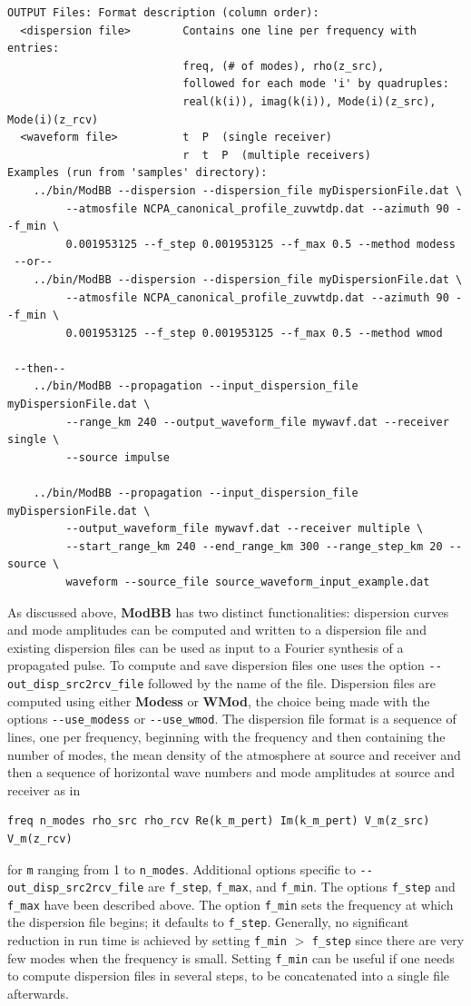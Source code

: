 \begin{verbatim}
OUTPUT Files: Format description (column order):
  <dispersion file>        Contains one line per frequency with entries:
                           freq, (# of modes), rho(z_src),
                           followed for each mode 'i' by quadruples:
                           real(k(i)), imag(k(i)), Mode(i)(z_src), Mode(i)(z_rcv)
  <waveform file>          t  P  (single receiver)
                           r  t  P  (multiple receivers)
Examples (run from 'samples' directory):
    ../bin/ModBB --dispersion --dispersion_file myDispersionFile.dat \
         --atmosfile NCPA_canonical_profile_zuvwtdp.dat --azimuth 90 --f_min \
         0.001953125 --f_step 0.001953125 --f_max 0.5 --method modess
 --or--
    ../bin/ModBB --dispersion --dispersion_file myDispersionFile.dat \
         --atmosfile NCPA_canonical_profile_zuvwtdp.dat --azimuth 90 --f_min \
         0.001953125 --f_step 0.001953125 --f_max 0.5 --method wmod

 --then--
    ../bin/ModBB --propagation --input_dispersion_file myDispersionFile.dat \
         --range_km 240 --output_waveform_file mywavf.dat --receiver single \
         --source impulse

    ../bin/ModBB --propagation --input_dispersion_file myDispersionFile.dat \
         --output_waveform_file mywavf.dat --receiver multiple \
         --start_range_km 240 --end_range_km 300 --range_step_km 20 --source \
         waveform --source_file source_waveform_input_example.dat

\end{verbatim}

As discussed above, {\bf ModBB} has two distinct functionalities: dispersion curves and mode amplitudes can be computed and written to a dispersion file and existing dispersion files can be used as input to a Fourier synthesis of a propagated pulse. To compute and save dispersion files one uses the option \verb+--out_disp_src2rcv_file+ followed by the name of the file. Dispersion files are computed using either {\bf Modess} or {\bf WMod}, the choice being made with the options \verb+--use_modess+ or \verb+--use_wmod+. The dispersion file format is a sequence of lines, one per frequency, beginning with the frequency and then containing the number of modes, the mean density of the atmosphere at source and receiver and then a sequence of horizontal wave numbers and mode amplitudes at source and receiver as in
\begin{verbatim}
freq n_modes rho_src rho_rcv Re(k_m_pert) Im(k_m_pert) V_m(z_src) V_m(z_rcv)
\end{verbatim} 
for \verb+m+ ranging from 1 to \verb+n_modes+. Additional options specific to \verb+--out_disp_src2rcv_file+ are \verb+f_step+, \verb+f_max+, and \verb+f_min+. The options \verb+f_step+ and \verb+f_max+ have been described above. The option \verb+f_min+ sets the frequency at which the dispersion file begins; it defaults to \verb+f_step+. Generally, no significant reduction in run time is achieved by setting \verb+f_min+ $>$ \verb+f_step+ since there are very few modes when the frequency is small. Setting \verb+f_min+ can be useful if one needs to compute dispersion files in several steps, to be concatenated into a single file afterwards. 

